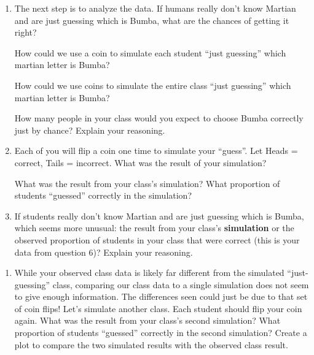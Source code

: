 \documentclass[
]{report}
\providecommand{\tightlist}{%
  \setlength{\itemsep}{0pt}\setlength{\parskip}{0pt}}
\begin{document}
\begin{enumerate}
\def\labelenumi{\arabic{enumi}.}
\setcounter{enumi}{8}
\item
  The next step is to analyze the data. If humans really don't know Martian and are just guessing which is Bumba, what are the chances of getting it right?
  \vspace{0.5in}

  How could we use a coin to simulate each student ``just guessing'' which martian letter is Bumba?
  \vspace{1in}

  How could we use coins to simulate the entire class ``just guessing'' which martian letter is Bumba?
  \vspace{1in}

  How many people in your class would you expect to choose Bumba correctly just by chance? Explain your reasoning.
  \vspace{1in}
\item
  Each of you will flip a coin one time to simulate your ``guess''. Let Heads = correct, Tails = incorrect. What was the result of your simulation?
  \vspace{.4in}

  What was the result from your class's simulation? What proportion of students ``guessed'' correctly in the simulation?
  \vspace{.4in}
\item
  If students really don't know Martian and are just guessing which is Bumba, which seems more unusual: the result from your class's \textbf{simulation} or the observed proportion of students in your class that were correct (this is your data from question 6)? Explain your reasoning.
\end{enumerate}

\newpage

\begin{enumerate}
\def\labelenumi{\arabic{enumi}.}
\setcounter{enumi}{11}
\tightlist
\item
  While your observed class data is likely far different from the simulated ``just-guessing'' class, comparing our class data to a single simulation does not seem to give enough information. The differences seen could just be due to that set of coin flips! Let's simulate another class. Each student should flip your coin again. What was the result from your class's second simulation? What proportion of students ``guessed'' correctly in the second simulation? Create a plot to compare the two simulated results with the observed class result.
\end{enumerate}
\end{document}
